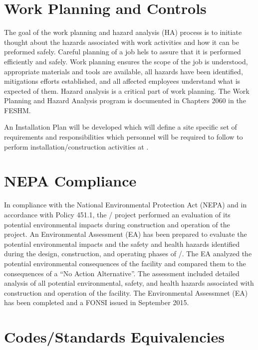 \section{Work Planning and Controls}

The goal of the work planning and hazard analysis (HA) process is to
initiate thought  about the hazards associated with work activities and
how it can be preformed safely. Careful planning of a job hels to assure that
it is performed efficiently and safely. Work planning ensures the
scope of the job is understood, appropriate materials and tools are
available, all hazards have been identified, mitigations efforts
established, and all affected employees understand what is expected of
them. Hazard analysis is a critical part of work planning.  The Work
Planning and Hazard Analysis program is documented in Chapters 2060 in
the FESHM.

An Installation  Plan will be developed
which will define a site specific set of  requirements and
responsibilities which personnel will be required to follow to perform
installation/construction activities at \surf.

\section{NEPA Compliance}

In compliance with the National Environmental Protection Act (NEPA)
and in accordance with  Policy 451.1, the / project
performed an evaluation of its potential environmental impacts during
construction and operation of the project.  An Environmental
Assessment (EA) has been prepared to evaluate the potential
environmental impacts and the safety and health hazards identified
during the design, construction, and operating phases of /.
The EA analyzed the potential environmental consequences of the
facility and compared them to the consequences of a ``No Action
Alternative''. The assessment included detailed analysis of all
potential environmental, safety, and health hazards associated with
construction and operation of the facility.  The Environmental
Assessmnet (EA) has been completed and a FONSI issued in September
2015.

\section{Codes/Standards Equivalencies}
\label{sec:esh_codes}

